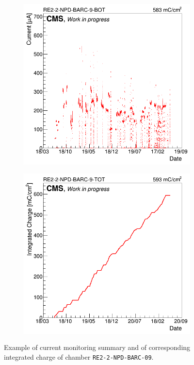 \begin{figure}[H]
\begin{subfigure}{0.5\linewidth}
        	\caption{\label{fig:Longevity:B}}
    	\end{subfigure}
    	\begin{subfigure}{0.5\linewidth}
			\centering
    		\includegraphics[width = \linewidth]{fig/chapt5/GIFpp-Longevity-monitoring-BOT.png}
        	\caption{\label{fig:Longevity:C}}
    	\end{subfigure}
    	\begin{subfigure}{0.5\linewidth}
			\centering
    		\includegraphics[width = \linewidth]{fig/chapt5/GIFpp-Longevity-int-charge.png}
        	\caption{\label{fig:Longevity:D}}
    	\end{subfigure}
		\caption{\label{fig:Longevity} Example of current monitoring summary and of corresponding integrated charge of chamber \texttt{RE2-2-NPD-BARC-09}.}
	\end{figure}
\vfill
	
